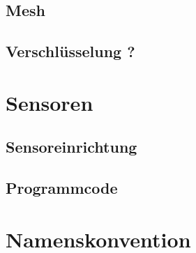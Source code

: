 \subsection{Mesh}

\subsection{Verschlüsselung ?}

\section{Sensoren}

\subsection{Sensoreinrichtung}

\subsection{Programmcode}

\section{Namenskonvention}
